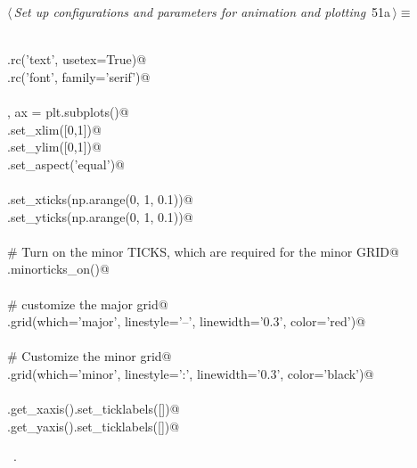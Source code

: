 \documentclass[11.5pt]{report}
\begin{document}
\begin{flushleft} \small
\begin{minipage}{\linewidth}\label{scrap64}\raggedright\small
{} $\langle\,${\itshape Set up configurations and parameters for animation and plotting}\nobreak\ {\footnotesize {51a}}$\,\rangle\equiv$
\vspace{-1ex}
\begin{list}{}{} \item
\mbox{}\verb@@\\
\mbox{}\verb@plt.rc('text', usetex=True)@\\
\mbox{}\verb@plt.rc('font', family='serif')@\\
\mbox{}\verb@@\\
\mbox{}\verb@fig, ax = plt.subplots()@\\
\mbox{}\verb@ax.set_xlim([0,1])@\\
\mbox{}\verb@ax.set_ylim([0,1])@\\
\mbox{}\verb@ax.set_aspect('equal')@\\
\mbox{}\verb@@\\
\mbox{}\verb@ax.set_xticks(np.arange(0, 1, 0.1))@\\
\mbox{}\verb@ax.set_yticks(np.arange(0, 1, 0.1))@\\
\mbox{}\verb@@\\
\mbox{}\verb@# Turn on the minor TICKS, which are required for the minor GRID@\\
\mbox{}\verb@ax.minorticks_on()@\\
\mbox{}\verb@@\\
\mbox{}\verb@# customize the major grid@\\
\mbox{}\verb@ax.grid(which='major', linestyle='--', linewidth='0.3', color='red')@\\
\mbox{}\verb@@\\
\mbox{}\verb@# Customize the minor grid@\\
\mbox{}\verb@ax.grid(which='minor', linestyle=':', linewidth='0.3', color='black')@\\
\mbox{}\verb@@\\
\mbox{}\verb@ax.get_xaxis().set_ticklabels([])@\\
\mbox{}\verb@ax.get_yaxis().set_ticklabels([])@\\
\mbox{}\verb@@{\NWsep}
\end{list}
\vspace{-1.5ex}
\footnotesize
\begin{list}{}{\setlength{\itemsep}{-\parsep}\setlength{\itemindent}{-\leftmargin}}
\item \NWtxtMacroRefIn\ .

\item{}
\end{list}
\end{minipage}\vspace{4ex}
\end{flushleft}
\end{document}
